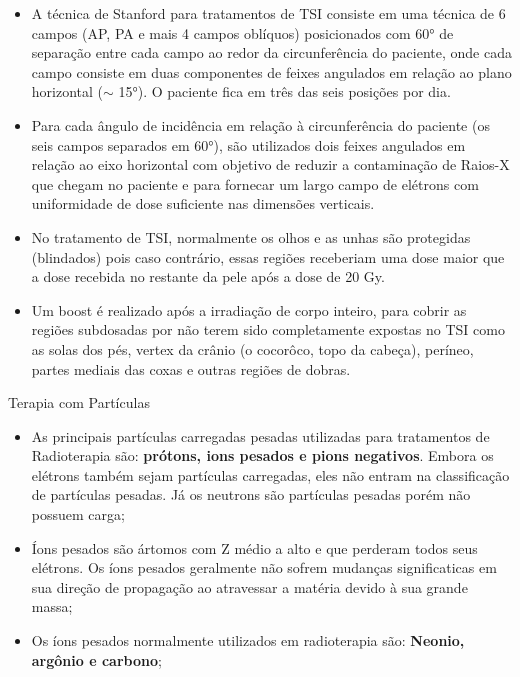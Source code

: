 \documentclass[11pt,a4paper]{article}
\newcounter{exemplo}
\begin{document}
\begin{exemplo}
\begin{itemize}
        \item A técnica de Stanford para tratamentos de TSI consiste em uma técnica de 6 campos (AP, PA e mais 4 campos oblíquos) posicionados com \ang{60} de separação entre cada campo ao redor da circunferência do paciente, onde cada campo consiste em duas componentes de feixes angulados em relação ao plano horizontal ($\sim$ \ang{15}). O paciente fica em três das seis posições por dia.
        
        \item Para cada ângulo de incidência em relação à circunferência do paciente (os seis campos separados em \ang{60}), são utilizados dois feixes angulados em relação ao eixo horizontal com objetivo de reduzir a contaminação de Raios-X que chegam no paciente e para fornecar um largo campo de elétrons com uniformidade de dose suficiente nas dimensões verticais.
        
        \item No tratamento de TSI, normalmente os olhos e as unhas são protegidas (blindados) pois caso contrário, essas regiões receberiam uma dose maior que a dose recebida no restante da pele após a dose de 20 Gy.
        
        \item Um boost é realizado após a irradiação de corpo inteiro, para cobrir as regiões subdosadas por não terem sido completamente expostas no TSI como as solas dos pés, vertex da crânio (o cocorôco, topo da cabeça), períneo, partes mediais das coxas e outras regiões de dobras. 

    \end{itemize}

    \textcolor{CarnationPink}{Terapia com Partículas} 
    \begin{itemize}
        \item As principais partículas carregadas pesadas utilizadas para tratamentos de Radioterapia são: \textbf{prótons, ions pesados e pions negativos}. Embora os elétrons também sejam partículas carregadas, eles não entram na classificação de partículas pesadas.  Já os neutrons são partículas pesadas porém não possuem carga;
        
        \item Íons pesados são ártomos com Z médio a alto e que perderam todos seus elétrons. Os íons pesados geralmente não sofrem mudanças significaticas em sua direção de propagação ao atravessar a matéria devido à sua grande massa;
        
        \item Os íons pesados normalmente utilizados em radioterapia são: \textbf{Neonio, argônio e carbono};
        

\end{itemize}
\end{exemplo}
\end{document}
